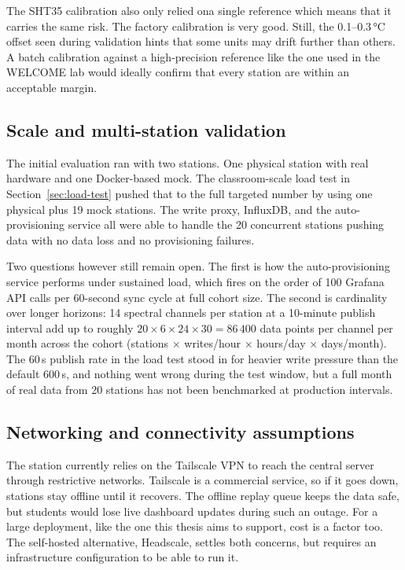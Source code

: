 The SHT35 calibration also only relied ona single reference which means that it carries the same risk. The factory calibration is very good. Still, the 0.1--0.3\,°C offset seen during validation hints that some units may drift further than others. A batch calibration against a high-precision reference like the one used in the WELCOME lab would ideally confirm that every station are within an acceptable margin.

\subsection{Scale and multi-station validation}

The initial evaluation ran with two stations. One physical station with real hardware and one Docker-based mock. The classroom-scale load test in Section~\ref{sec:load-test} pushed that to the full targeted number by using one physical plus 19 mock stations. The write proxy, InfluxDB, and the auto-provisioning service all were able to handle the 20 concurrent stations pushing data with no data loss and no provisioning failures.

Two questions however still remain open. The first is how the auto-provisioning service performs under sustained load, which fires on the order of 100 Grafana API calls per 60-second sync cycle at full cohort size. The second is cardinality over longer horizons: 14 spectral channels per station at a 10-minute publish interval add up to roughly $20 \times 6 \times 24 \times 30 = 86\,400$ data points per channel per month across the cohort (stations × writes/hour × hours/day × days/month). The 60\,s publish rate in the load test stood in for heavier write pressure than the default 600\,s, and nothing went wrong during the test window, but a full month of real data from 20 stations has not been benchmarked at production intervals.

\subsection{Networking and connectivity assumptions}

The station currently relies on the Tailscale VPN to reach the central server through restrictive networks. Tailscale is a commercial service, so if it goes down, stations stay offline until it recovers. The offline replay queue keeps the data safe, but students would lose live dashboard updates during such an outage. For a large deployment, like the one this thesis aims to support, cost is a factor too. The self-hosted alternative, Headscale, settles both concerns, but requires an infrastructure configuration to be able to run it.

